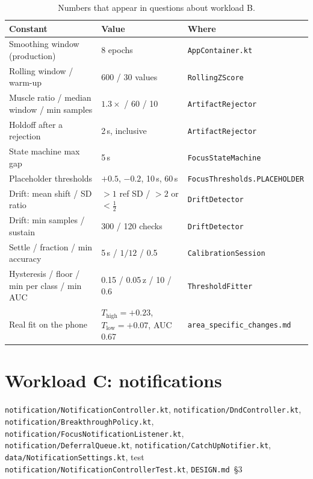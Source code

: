 \documentclass[10pt,a4paper]{article}
\newcommand{\file}[1]{\texttt{\small #1}}          %
\newcommand{\code}[1]{\texttt{#1}}                  %
\newcommand{\Thigh}{T_{\mathrm{high}}}
\newcommand{\Tlow}{T_{\mathrm{low}}}
\begin{document}
\begin{table}[!htbp]\centering\small
\begin{tabularx}{\textwidth}{@{}X l l@{}}
\toprule
\textbf{Constant} & \textbf{Value} & \textbf{Where} \\
\midrule
Smoothing window (production) & 8 epochs & \file{AppContainer.kt} \\
Rolling window / warm-up & 600 / 30 values & \code{RollingZScore} \\
Muscle ratio / median window / min samples & $1.3\times$ / 60 / 10 & \code{ArtifactRejector} \\
Holdoff after a rejection & 2\,s, inclusive & \code{ArtifactRejector} \\
State machine max gap & 5\,s & \code{FocusStateMachine} \\
Placeholder thresholds & $+0.5$, $-0.2$, 10\,s, 60\,s & \code{FocusThresholds.PLACEHOLDER} \\
Drift: mean shift / SD ratio & $>1$ ref SD / $>2$ or $<\tfrac12$ & \code{DriftDetector} \\
Drift: min samples / sustain & 300 / 120 checks & \code{DriftDetector} \\
Settle / fraction / min accuracy & 5\,s / $1/12$ / 0.5 & \code{CalibrationSession} \\
Hysteresis / floor / min per class / min AUC & 0.15 / 0.05\,z / 10 / 0.6 & \code{ThresholdFitter} \\
Real fit on the phone & $\Thigh = +0.23$, $\Tlow = +0.07$, AUC 0.67 & \file{area\_specific\_changes.md} \\
\bottomrule
\end{tabularx}
\caption{Numbers that appear in questions about workload B.}\label{tab:bconst}
\end{table}
\section{Workload C: notifications}\label{sec:c}

\begin{files}
\file{notification/NotificationController.kt}, \file{notification/DndController.kt},
\file{notification/BreakthroughPolicy.kt}, \file{notification/FocusNotificationListener.kt},
\file{notification/DeferralQueue.kt}, \file{notification/CatchUpNotifier.kt},
\file{data/NotificationSettings.kt}, test \file{notification/NotificationControllerTest.kt},
\file{DESIGN.md}~\S3
\end{files}
\end{document}
